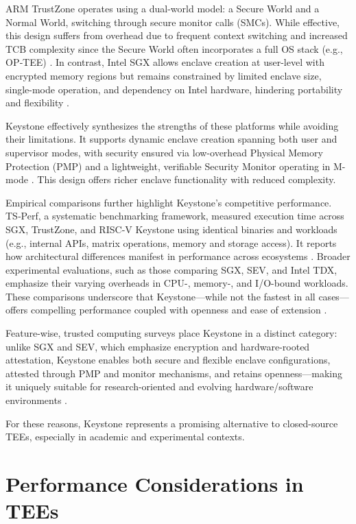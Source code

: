 ARM TrustZone operates using a dual-world model: a Secure World and a Normal World, switching through secure monitor calls (SMCs). While effective, this design suffers from overhead due to frequent context switching and increased TCB complexity since the Secure World often incorporates a full OS stack (e.g., OP‑TEE) \cite{turn0search0}. In contrast, Intel SGX allows enclave creation at user-level with encrypted memory regions but remains constrained by limited enclave size, single-mode operation, and dependency on Intel hardware, hindering portability and flexibility \cite{turn0search0}.

Keystone effectively synthesizes the strengths of these platforms while avoiding their limitations. It supports dynamic enclave creation spanning both user and supervisor modes, with security ensured via low-overhead Physical Memory Protection (PMP) and a lightweight, verifiable Security Monitor operating in M-mode \cite{dayeol2019keystone}. This design offers richer enclave functionality with reduced complexity.

Empirical comparisons further highlight Keystone’s competitive performance. TS‑Perf, a systematic benchmarking framework, measured execution time across SGX, TrustZone, and RISC‑V Keystone using identical binaries and workloads (e.g., internal APIs, matrix operations, memory and storage access). It reports how architectural differences manifest in performance across ecosystems \cite{turn0search5}. Broader experimental evaluations, such as those comparing SGX, SEV, and Intel TDX, emphasize their varying overheads in CPU-, memory-, and I/O-bound workloads. These comparisons underscore that Keystone—while not the fastest in all cases—offers compelling performance coupled with openness and ease of extension \cite{turn0search2,turn0search10}.

Feature-wise, trusted computing surveys place Keystone in a distinct category: unlike SGX and SEV, which emphasize encryption and hardware-rooted attestation, Keystone enables both secure and flexible enclave configurations, attested through PMP and monitor mechanisms, and retains openness—making it uniquely suitable for research-oriented and evolving hardware/software environments \cite{turn0search9}.

For these reasons, Keystone represents a promising alternative to closed-source TEEs, especially in academic and experimental contexts.


\section{Performance Considerations in TEEs}

